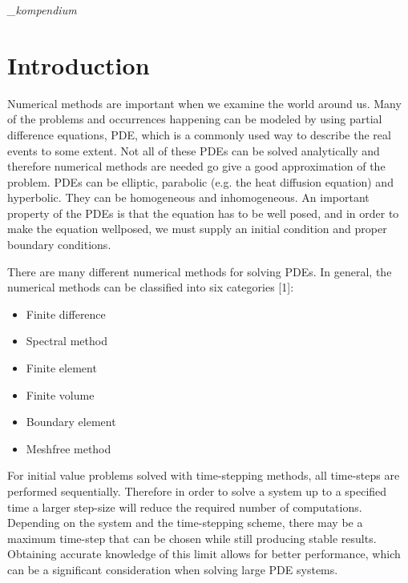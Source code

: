 \documentclass[a4paper,10pt,twoside]{article}
\begin{document}
\it_kompendium

%
%

\newcommand{\abs}[1]{\left\lvert\ #1 \ \right\rvert}


\section{Introduction}

Numerical methods are important when we examine the world around us. Many of the problems and occurrences happening can be modeled by using partial difference equations, PDE, which is a commonly used way to describe the real events to some extent. Not all of these PDEs can be solved analytically and therefore numerical methods are needed go give a good approximation of the problem. PDEs can be elliptic, parabolic (e.g. the heat diffusion equation) and hyperbolic. They can be homogeneous and inhomogeneous. An important property of the PDEs is that the equation has to be well posed, and in order to make the equation wellposed, we must supply an initial condition and proper boundary conditions.

There are many different numerical methods for solving PDEs. In general, the numerical methods can be classified into six categories [1]:   
\begin{itemize}
    \item Finite difference
    \item Spectral method
    \item Finite element
    \item Finite volume
    \item Boundary element
    \item Meshfree method
\end{itemize}
For initial value problems solved with time-stepping
methods, all time-steps are performed sequentially. Therefore in order to solve a system up to a specified time
a larger step-size will reduce the required number of
computations. Depending on the system and the time-stepping scheme,
there may be a maximum time-step that can be chosen while still producing stable results. Obtaining accurate knowledge of this limit allows for better performance,
which can be a significant consideration when solving large PDE systems.
\end{document}
